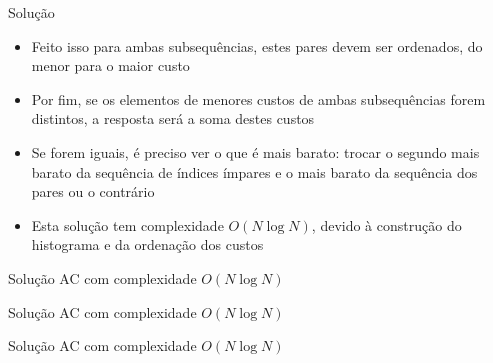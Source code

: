 \begin{frame}[fragile]{Solução}

    \begin{itemize}
        \item Feito isso para ambas subsequências, estes pares devem ser ordenados, do menor para
            o maior custo

        \item Por fim, se os elementos de menores custos de ambas subsequências forem distintos,
            a resposta será a soma destes custos

        \item Se forem iguais, é preciso ver o que é mais barato: trocar o segundo mais barato
            da sequência de índices ímpares e o mais barato da sequência dos pares ou o 
            contrário

        \item Esta solução tem complexidade $O(N\log N)$, devido à construção do histograma e
            da ordenação dos custos
    \end{itemize}

\end{frame}


\begin{frame}[fragile]{Solução AC com complexidade $O(N\log N)$}
\end{frame}

\begin{frame}[fragile]{Solução AC com complexidade $O(N\log N)$}
\end{frame}

\begin{frame}[fragile]{Solução AC com complexidade $O(N\log N)$}
\end{frame}
